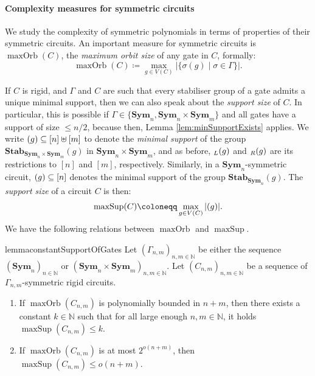 \documentclass[10pt,a4paper]{article}
\theoremstyle{definition}
\theoremstyle{plain}
\theoremstyle{remark}
\newcommand{\Sym}{\mathbf{Sym}}
\newcommand{\Stab}{\mathbf{Stab}}
\newcommand{\bbN}{\mathbb{N}}
\let\sup\relax
\DeclareMathOperator{\sup}{sup}
\DeclareMathOperator{\maxOrb}{maxOrb}
\DeclareMathOperator{\maxSup}{maxSup}
\begin{document}
\paragraph*{Complexity measures for symmetric circuits}
We study the complexity of symmetric polynomials in terms of properties of their symmetric circuits. 
An important measure for symmetric circuits is $\maxOrb(C)$, the \emph{maximum orbit size} of any gate in $C$, formally:
\[
\maxOrb(C) \coloneqq \max_{g \in V(C)} | \{ \sigma(g) \mid \sigma \in \Gamma \}  |.
\]

If $C$ is rigid, and $\Gamma$ and $C$ are such that every stabiliser
group of a gate admits a unique minimal support, then we can also
speak about the \emph{support size} of $C$. In particular, this is
possible if $\Gamma \in \{\Sym_n, \Sym_n \times
\Sym_m\}$ and all gates have a support of size $\leq n/2$, because then, Lemma \ref{lem:minSupportExists} applies.
We write $\sup(g) \subseteq [n] \uplus [m]$ to denote the \emph{minimal support} of the group $\Stab_{\Sym_n \times \Sym_m}(g)$ in $\Sym_n \times \Sym_m$, and as before, $\sup_L(g)$ and $\sup_R(g)$ are its restrictions to $[n]$ and $[m]$, respectively. Similarly, in a $\Sym_n$-symmetric circuit, $\sup(g) \subseteq [n]$ denotes the minimal support of the group $\Stab_{\Sym_n}(g)$.
The \emph{support size} of a circuit $C$ is then:	
\[
\maxSup(C) \coloneqq \max_{g \in V(C)} | \sup(g) |.
\]	
We have the following relations between $\maxOrb$ and $\maxSup$. 
\begin{restatable}{lemma}{constantSupportOfGates}\label{lem:constantSupportOfGates}
	Let $(\Gamma_{n,m})_{n,m \in \bbN}$ be either the sequence $(\Sym_n)_{n \in \bbN}$ or $(\Sym_{n} \times \Sym_{m})_{n,m \in \bbN}$.
	Let $(C_{n,m})_{n,m \in \bbN}$ be a sequence of $\Gamma_{n,m}$-symmetric rigid circuits.
	\begin{enumerate}
		\item If $\maxOrb(C_{n,m})$ is polynomially bounded in $n+m$, then there exists a constant $k \in \bbN$ such that for all large enough $n,m \in \bbN$, it holds $\maxSup(C_{n,m}) \leq k$.
		\item If $\maxOrb(C_{n,m})$ is at most $2^{o(n+m)}$, then $\maxSup(C_{n,m}) \leq o(n+m)$.
	\end{enumerate}	
\end{restatable}	
\end{document}
